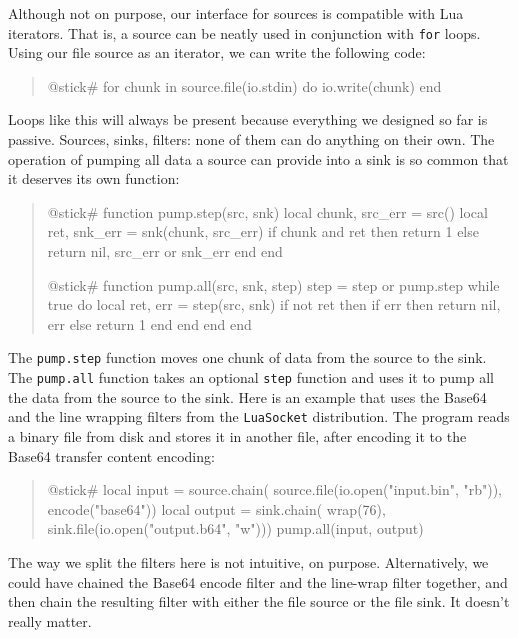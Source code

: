 \documentclass[10pt]{article}
\begin{document}
Although not on purpose, our interface for sources is
compatible with Lua iterators. That is, a source can be
neatly used in conjunction with \texttt{for} loops.  Using
our file source as an iterator, we can write the following
code:
\begin{quote}
\begin{lua}
@stick#
for chunk in source.file(io.stdin) do
  io.write(chunk)
end
%
\end{lua}
\end{quote}

Loops like this will always be present because everything 
we designed so far is passive. Sources, sinks, filters: none
of them can do anything on their own. The operation of
pumping all data a source can provide into a sink is so
common that it deserves its own function:
\begin{quote}
\begin{lua}
@stick#
function pump.step(src, snk)
  local chunk, src_err = src()
  local ret, snk_err = snk(chunk, src_err)
  if chunk and ret then return 1
  else return nil, src_err or snk_err end
end
%

@stick#
function pump.all(src, snk, step)
    step = step or pump.step
    while true do
        local ret, err = step(src, snk)
        if not ret then
            if err then return nil, err
            else return 1 end
        end 
    end
end
%
\end{lua}
\end{quote}

The \texttt{pump.step} function moves one chunk of data from
the source to the sink. The \texttt{pump.all} function takes
an optional \texttt{step} function and uses it to pump all the
data from the source to the sink. 
Here is an example that uses the Base64 and the
line wrapping filters from the \texttt{LuaSocket}
distribution.  The program reads a binary file from
disk and stores it in another file, after encoding it to the
Base64 transfer content encoding:
\begin{quote}
\begin{lua}
@stick#
local input = source.chain(
  source.file(io.open("input.bin", "rb")), 
  encode("base64"))
local output = sink.chain(
  wrap(76),
  sink.file(io.open("output.b64", "w")))
pump.all(input, output)
%
\end{lua}
\end{quote}

The way we split the filters here is not intuitive, on
purpose.  Alternatively, we could have chained the Base64
encode filter and the line-wrap filter together, and then
chain the resulting filter with either the file source or
the file sink. It doesn't really matter. 
\end{document}
